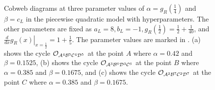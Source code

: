 \begin{figure}
	\centering
	\caption[Cobweb diagrams of the first piecewise quadratic model with compound parameters]{
	Cobweb diagrams at three parameter values of $\alpha = g_R\left(\frac{1}{4}\right)$ and $\beta = c_L$ in the piecewise quadratic model with hyperparameters.
	The other parameters are fixed as $a_L = 8, b_L = -1, g_R\left(\frac{1}{2}\right) = \frac{1}{2} + \frac{1}{40}$, and $\left. \frac{d}{dx} g_R(x) \right|_{x = \frac{1}{2}} = 1 + \frac{1}{5}$.
	The parameter values are marked in .
	(a) shows the cycle $\mathcal{O}_{\mathcal{A}^4\mathcal{B}^5\mathcal{C}^4\mathcal{D}^5}$ at the point $A$ where $\alpha = 0.42$ and $\beta = 0.1525$,
	(b) shows the cycle $\mathcal{O}_{\mathcal{A}^3\mathcal{B}^6\mathcal{D}^3\mathcal{C}^6}$ at the point $B$ where $\alpha = 0.385$ and $\beta = 0.1675$,
	and (c) shows the cycle $\mathcal{O}_{\mathcal{A}^2\mathcal{B}^7\mathcal{C}^2\mathcal{D}^7}$ at the point $C$ where $\alpha = 0.385$ and $\beta = 0.1675$.
	}
	\label{fig:setup.quad.hyper.1.cobwebs}
\end{figure}

